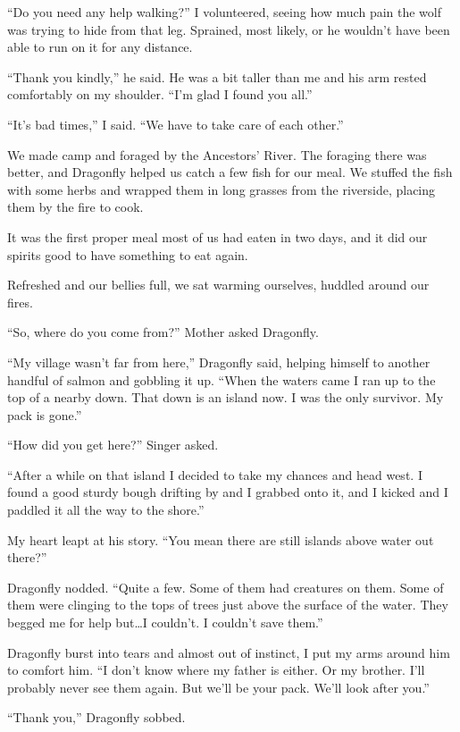 ``Do you need any help walking?'' I volunteered, seeing how much pain the wolf was trying to hide from that leg. Sprained, most likely, or he wouldn't have been able to run on it for any distance.

``Thank you kindly,'' he said. He was a bit taller than me and his arm rested comfortably on my shoulder. ``I'm glad I found you all.''

``It's bad times,'' I said. ``We have to take care of each other.''

\secdiv

\noindent We made camp and foraged by the Ancestors' River. The foraging there was better, and Dragonfly helped us catch a few fish for our meal. We stuffed the fish with some herbs and wrapped them in long grasses from the riverside, placing them by the fire to cook.

It was the first proper meal most of us had eaten in two days, and it did our spirits good to have something to eat again.

Refreshed and our bellies full, we sat warming ourselves, huddled around our fires.

``So, where do you come from?'' Mother asked Dragonfly.

``My village wasn't far from here,'' Dragonfly said, helping himself to another handful of salmon and gobbling it up. ``When the waters came I ran up to the top of a nearby down. That down is an island now. I was the only survivor. My pack is gone.''

``How did you get here?'' Singer asked.

``After a while on that island I decided to take my chances and head west. I found a good sturdy bough drifting by and I grabbed onto it, and I kicked and I paddled it all the way to the shore.''

My heart leapt at his story. ``You mean there are still islands above water out there?''

Dragonfly nodded. ``Quite a few. Some of them had creatures on them. Some of them were clinging to the tops of trees just above the surface of the water. They begged me for help but\ldots{}I couldn't. I couldn't save them.''

Dragonfly burst into tears and almost out of instinct, I put my arms around him to comfort him. ``I don't know where my father is either. Or my brother. I'll probably never see them again. But we'll be your pack. We'll look after you.''

``Thank you,'' Dragonfly sobbed.

